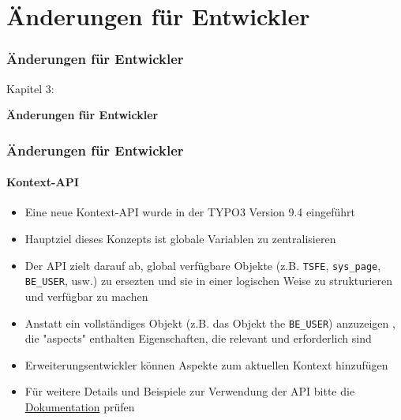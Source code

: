 %

\section{Änderungen für Entwickler}
\begin{frame}[fragile]
	\frametitle{Änderungen für Entwickler}

	\begin{center}\huge{Kapitel 3:}\end{center}
	\begin{center}\huge{\color{typo3darkgrey}\textbf{Änderungen für Entwickler}}\end{center}

\end{frame}


\begin{frame}[fragile]
	\frametitle{Änderungen für Entwickler}
	\framesubtitle{Kontext-API}

	\begin{itemize}
		\item Eine neue Kontext-API wurde in der TYPO3 Version 9.4 eingeführt
		\item Hauptziel dieses Konzepts ist globale Variablen zu zentralisieren
		\item Der API zielt darauf ab, global verfügbare Objekte (z.B.
			\texttt{TSFE}, \texttt{sys\_page}, \texttt{BE\_USER}, usw.) zu ersezten
			und sie in einer logischen Weise zu strukturieren und verfügbar zu machen
		\item Anstatt ein vollständiges Objekt (z.B. das Objekt the \texttt{BE\_USER})
			 anzuzeigen , die "aspects" enthalten Eigenschaften, die relevant
			und erforderlich sind
		\item Erweiterungsentwickler können Aspekte zum aktuellen Kontext hinzufügen
		\item Für weitere Details und Beispiele zur Verwendung der API bitte die \href{https://docs.typo3.org/typo3cms/extensions/core/latest/Changelog/9.4/Feature-85389-ContextAPIForConsistentDataHandling.rst}{Dokumentation}
			prüfen
	\end{itemize}

\end{frame}

